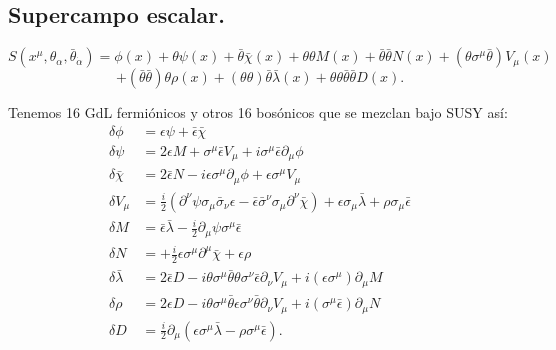 \documentclass[10pt,a4paper]{beamer}
\begin{document}
\subsection{Supercampo escalar.}
\begin{frame}{\subsecname}
  \vspace{-1em}
\[
  S(x^\mu, \theta_\alpha, \bar\theta_{\dot\alpha})
  =
  \phi(x) + \theta\psi(x) + \bar\theta\bar\chi(x) + \theta\theta M(x) +
  \bar\theta\bar\theta N(x) + (\theta \sigma^\mu\bar\theta ) V_\mu(x) 
\]
\[
 + (\bar\theta\bar\theta) \theta\rho(x) +  (\theta\theta)
  \bar\theta\bar\lambda(x) + \theta\theta\bar\theta\bar\theta D(x).
\]

Tenemos 16 GdL fermiónicos y otros 16 bosónicos que se mezclan bajo SUSY así:
\[
  \begin{aligned}
    \delta\phi &= \epsilon\psi +\bar\epsilon\bar\chi 
     \\
    \delta\psi &=  2\epsilon M+\sigma^\mu\bar\epsilon V_\mu+ i\sigma^\mu\bar\epsilon \partial_\mu\phi 
 \\
    \delta\bar\chi &= 
    2\bar\epsilon N
    -i\epsilon\sigma^\mu \partial_\mu\phi +\epsilon\sigma^\mu V_\mu
     \\
    \delta V_\mu
    &=\frac{i}{2}\left(\partial^\nu\psi \sigma_\mu \bar\sigma_\nu \epsilon 
    -  \bar\epsilon\bar\sigma^\nu  \sigma_\mu\partial^\nu\bar\chi\right) 
    +
    \epsilon\sigma_\mu\bar\lambda+ \rho\sigma_\mu\bar\epsilon
\\
    \delta M& = 
    \bar\epsilon\bar\lambda
     -\frac{ i}{2} \partial_\mu\psi\sigma^\mu \bar\epsilon
    \\
    \delta N  &= + \frac{i}{2}\epsilon \sigma^\mu \partial^\mu\bar\chi   
+  \epsilon\rho
    \\
    \delta\bar\lambda & = 2\bar\epsilon D   
      - i \theta\sigma^\mu\bar\theta \theta\sigma^\nu\bar\epsilon \partial_\nu V_\mu
      +i(\epsilon\sigma^\mu)\partial_\mu M
    \\
    \delta \rho  &=   2\epsilon D - i \theta\sigma^\mu\bar\theta \epsilon\sigma^\nu\bar\theta \partial_\nu V_\mu
    +i(\sigma^\mu\bar\epsilon)
    \partial_\mu N     \\
    \delta D &=\frac{i}{2} \partial_\mu \left( \epsilon\sigma^\mu\bar\lambda -
    \rho\sigma^\mu \bar\epsilon\right).
  \end{aligned}
\]

\end{frame}
\end{document}

